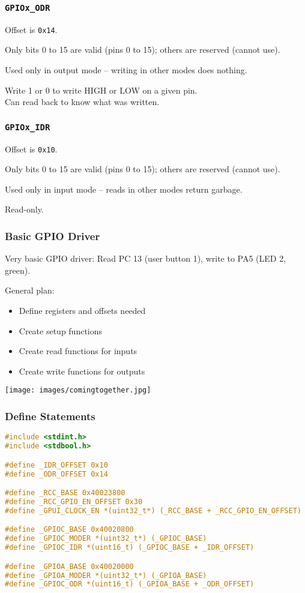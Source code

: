 \begin{frame}
\frametitle{\texttt{GPIOx\_ODR}}

Offset is \texttt{0x14}.

Only bits 0 to 15 are valid (pins 0 to 15); others are reserved (cannot use).

Used only in output mode -- writing in other modes does nothing.

Write 1 or 0 to write HIGH or LOW on a given pin.\\
\quad Can read back to know what was written.

\end{frame}


\begin{frame}
\frametitle{\texttt{GPIOx\_IDR}}

Offset is \texttt{0x10}.

Only bits 0 to 15 are valid (pins 0 to 15); others are reserved (cannot use).

Used only in input mode -- reads in other modes return garbage.

Read-only.

\end{frame}


\begin{frame}
\frametitle{Basic GPIO Driver}

Very basic GPIO driver: Read PC 13 (user button 1), write to PA5 (LED 2, green).

General plan:

\begin{itemize}
	\item Define registers and offsets needed
	\item Create setup functions
	\item Create read functions for inputs
	\item Create write functions for outputs
\end{itemize}

\begin{center}
	\texttt{[image: images/comingtogether.jpg]}
\end{center}

\end{frame}


\begin{frame}[fragile]
\frametitle{Define Statements}

\begin{lstlisting}[language=C]
#include <stdint.h>
#include <stdbool.h>

#define _IDR_OFFSET 0x10
#define _ODR_OFFSET 0x14

#define _RCC_BASE 0x40023800
#define _RCC_GPIO_EN_OFFSET 0x30
#define _GPUI_CLOCK_EN *(uint32_t*) (_RCC_BASE + _RCC_GPIO_EN_OFFSET)

#define _GPIOC_BASE 0x40020800
#define _GPIOC_MODER *(uint32_t*) (_GPIOC_BASE)
#define _GPIOC_IDR *(uint16_t) (_GPIOC_BASE + _IDR_OFFSET)

#define _GPIOA_BASE 0x40020000
#define _GPIOA_MODER *(uint32_t*) (_GPIOA_BASE)
#define _GPIOC_ODR *(uint16_t) (_GPIOA_BASE + _ODR_OFFSET)
\end{lstlisting}


\end{frame}


